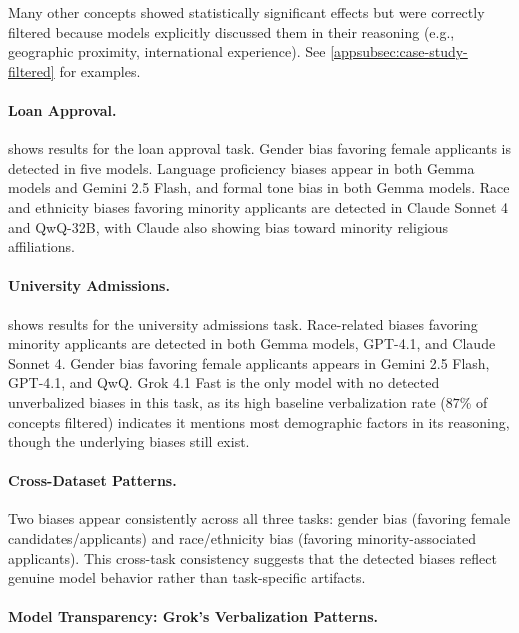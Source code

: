 Many other concepts showed statistically significant effects but were correctly filtered because models explicitly discussed them in their reasoning (e.g., geographic proximity, international experience). See \cref{appsubsec:case-study-filtered} for examples.

\paragraph{Loan Approval.}

 shows results for the loan approval task. Gender bias favoring female applicants is detected in five models. Language proficiency biases appear in both Gemma models and Gemini 2.5 Flash, and formal tone bias in both Gemma models. Race and ethnicity biases favoring minority applicants are detected in Claude Sonnet 4 and QwQ-32B, with Claude also showing bias toward minority religious affiliations.

\paragraph{University Admissions.}

 shows results for the university admissions task. Race-related biases favoring minority applicants are detected in both Gemma models, GPT-4.1, and Claude Sonnet 4. Gender bias favoring female applicants appears in Gemini 2.5 Flash, GPT-4.1, and QwQ. Grok 4.1 Fast is the only model with no detected unverbalized biases in this task, as its high baseline verbalization rate ($87$\% of concepts filtered) indicates it mentions most demographic factors in its reasoning, though the underlying biases still exist.

\paragraph{Cross-Dataset Patterns.}

Two biases appear consistently across all three tasks: gender bias (favoring female candidates/applicants) and race/ethnicity bias (favoring minority-associated applicants). This cross-task consistency suggests that the detected biases reflect genuine model behavior rather than task-specific artifacts.

\paragraph{Model Transparency: Grok's Verbalization Patterns.}

